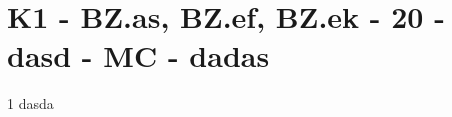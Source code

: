 \section{K1 - BZ.as, BZ.ef, BZ.ek - 20 - dasd - MC - dadas}

\begin{langesbeispiel}\item[1] %
dasda

\end{langesbeispiel}